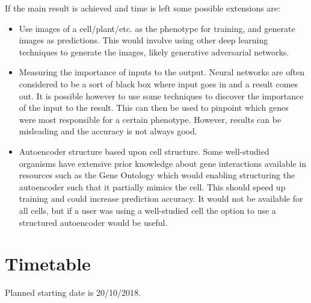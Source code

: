 \documentclass[12pt,a4paper,twoside,openany]{article}
\begin{document}
If the main result is achieved and time is left some possible extensions are:

\begin{itemize}
    \item Use images of a cell/plant/etc. as the phenotype for training, and generate images as predictions. This would involve using other deep learning techniques to generate the images, likely generative adversarial networks.
    
    \item Measuring the importance of inputs to the output. Neural networks are often considered to be a sort of black box where input goes in and a result comes out. It is possible however to use some techniques to discover the importance of the input to the result. This can then be used to pinpoint which genes were most responsible for a certain phenotype. However, results can be misleading and the accuracy is not always good.
    
    \item Autoencoder structure based upon cell structure. Some well-studied organisms have extensive prior knowledge about gene interactions available in resources such as the Gene Ontology which would enabling structuring the autoencoder such that it partially mimics the cell. This should speed up training and could increase prediction accuracy. It would not be available for all cells, but if a user was using a well-studied cell the option to use a structured autoencoder would be useful.
\end{itemize}


\section*{Timetable}

Planned starting date is 20/10/2018.
\end{document}

